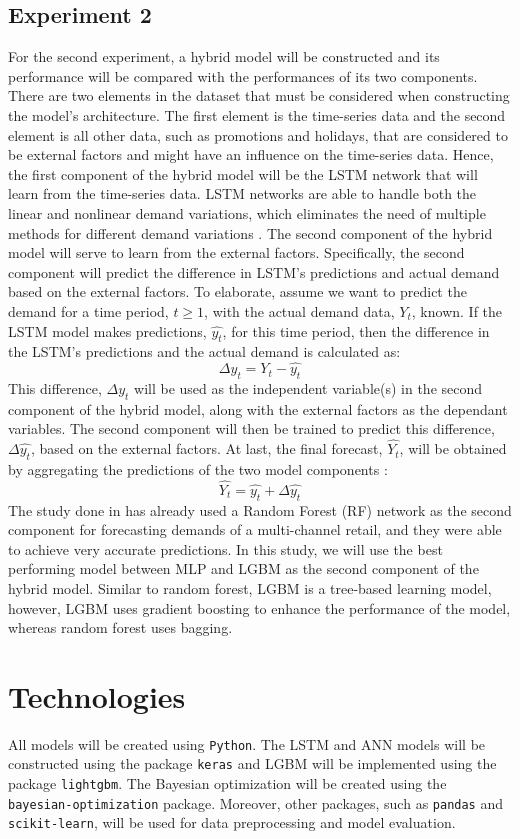 \subsection*{Experiment 2}
For the second experiment, a hybrid model will be constructed and its performance will be compared with the performances of its two components.
There are two elements in the dataset that must be considered when constructing the model's architecture.
The first element is the time-series data and the second element is all other data, such as promotions and holidays, that are considered to be external factors and might have an influence on the time-series data.
Hence, the first component of the hybrid model will be the LSTM network that will learn from the time-series data. 
LSTM networks are able to handle both the linear and nonlinear demand variations, which eliminates the need of multiple methods for different demand variations \cite{c8}.
The second component of the hybrid model will serve to learn from the external factors. 
Specifically, the second component will predict the difference in LSTM's predictions and actual demand based on the external factors.
To elaborate, assume we want to predict the demand for a time period, \(t \geq 1\), with the actual demand data, \(Y_t\), known. 
If the LSTM model makes predictions, \(\hat{y_t}\), for this time period, then the difference in the LSTM's predictions and the actual demand is calculated as:
\[\Delta y_t = Y_t - \hat{y_t}\]
This difference, \(\Delta y_t\) will be used as the independent variable(s) in the second component of the hybrid model, along with the external factors as the dependant variables. The second component will then be trained to predict this difference, \(\Delta \hat{y_t}\), based on the external factors. At last, the final forecast, \(\hat{Y_t}\), will be obtained by aggregating the predictions of the two model components \cite{c8}:
\[\hat{Y_t} = \hat{y_t} + \Delta \hat{y_t}\]
The study done in \cite{c8} has already used a Random Forest (RF) network as the second component for forecasting demands of a multi-channel retail, and they were able to achieve very accurate predictions.
In this study, we will use the best performing model between MLP and LGBM as the second component of the hybrid model. 
Similar to random forest, LGBM is a tree-based learning model, however, LGBM uses gradient boosting to enhance the performance of the model, whereas random forest uses bagging.

\section{Technologies}
All models will be created using \texttt{Python}. 
The LSTM and ANN models will be constructed using the package \texttt{keras} and LGBM will be implemented using the package \texttt{lightgbm}. 
The Bayesian optimization will be created using the \texttt{bayesian-optimization} package.
Moreover, other packages, such as \texttt{pandas} and \texttt{scikit-learn}, will be used for data preprocessing and model evaluation.